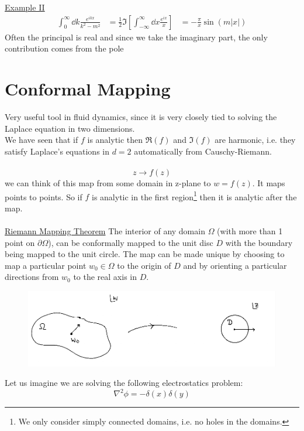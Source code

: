 \documentclass[a4paper,12pt]{article}
\begin{document}
\underline{Example II}
\begin{equation}
	\begin{aligned}
		\int_{0}^{\infty} \dd k\frac{e^{ikx}}{k^2-m^2} &=\frac{1}{2}\Im\left[ \int_{-\infty}^{\infty} \dd x\frac{e^{ix}}{x}\right]
		&=-\frac{\pi}{x}\sin(m|x|)
	\end{aligned}
\end{equation}
Often the principal is real and since we take the imaginary part, the only contribution comes from the pole 
\section{Conformal Mapping}
Very useful tool in fluid dynamics, since it is very closely tied to solving the Laplace equation in two dimensions.\\
We have seen that if $f$ is analytic then $\Re(f)$ and $\Im (f)$ are harmonic, i.e. they satisfy Laplace's equations in $d=2$ automatically from Causchy-Riemann.
\\\\
\begin{equation}
z\to f(z)
\end{equation}
we can think of this map from some domain in z-plane to $w=f(z)$. It maps points to points. So if $f$ is analytic in the first region\footnote{We only consider simply connected domains, i.e. no holes in the domains.} then it is analytic after the map.
\\\\
\underline{Riemann Mapping Theorem}
The interior of any domain $\Omega$ (with more than 1 point on $\partial\Omega$), can be conformally mapped to the unit disc $D$ with the boundary being mapped to the unit circle. The map can be made unique by choosing to map a particular point $w_0\in \Omega$ to the origin of $D$ and by orienting a particular directions from $w_0$ to the real axis in $D$.
\begin{figure}[H]
	\centering
	\includegraphics[width=0.7\linewidth]{3}
	\caption{}
	\label{fig:3}
\end{figure}
Let us imagine we are solving the following electrostatics problem:
\begin{equation}
\nabla^2\phi =-\delta(x)\delta(y)
\end{equation}
\end{document}
